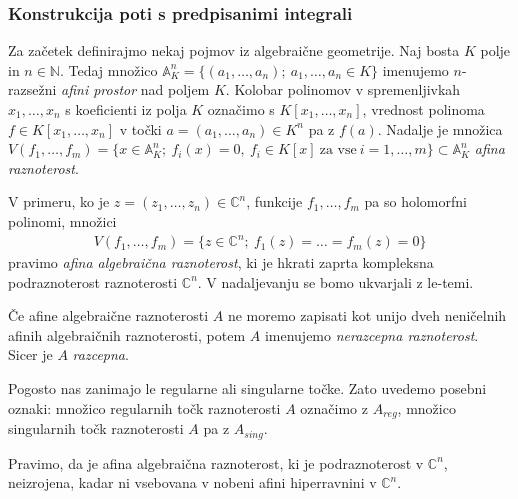 \documentclass[12pt,a4paper,twoside]{article}
\theoremstyle{definition} %
\theoremstyle{plain} %
\numberwithin{equation}{section}  %
\begin{document}
\subsubsection{Konstrukcija poti s predpisanimi integrali}
%
Za začetek definirajmo nekaj pojmov iz algebraične geometrije. \newline
Naj bosta $K$ polje in $n \in \mathbb{N}$. Tedaj množico $\mathbb{A}_{K}^{n} = \{ (a_{1}, \dots , a_{n}); \ a_{1}, \dots , a_{n} \in K \}$ imenujemo $n$-razsežni \emph{afini prostor} nad poljem $K$.
Kolobar polinomov v spremenljivkah $x_{1}, \dots , x_{n}$ s koeficienti iz polja $K$ označimo s $K[x_{1}, \dots , x_{n}]$, vrednost polinoma $f \in K[x_{1}, \dots , x_{n}]$ v točki $a = (a_{1}, \dots , a_{n}) \in K^{n}$ pa z $f(a)$.
Nadalje je množica $V(f_{1}, \dots , f_{m}) = \{ x \in \mathbb{A}_{K}^{n} ; \ f_{i}(x) = 0, \ f_{i} \in K[x] \ \textrm{za vse} \ i = 1, \dots , m \} \subset \mathbb{A}_{K}^{n}$ \emph{afina raznoterost}.

V primeru, ko je $z = (z_{1}, \dots , z_{n}) \in \mathbb{C}^{n}$, funkcije $f_{1}, \dots , f_{m}$ pa so holomorfni polinomi, množici
\begin{gather}
V(f_{1}, \dots , f_{m}) = \{ z \in \mathbb{C}^{n}; \ f_{1}(z) = \dots = f_{m}(z) = 0 \}
\end{gather}
pravimo \emph{afina algebraična raznoterost}, ki je hkrati zaprta kompleksna podraznoterost raznoterosti $\mathbb{C}^{n}$.
V nadaljevanju se bomo ukvarjali z le-temi.

Če afine algebraične raznoterosti $A$ ne moremo zapisati kot unijo dveh neničelnih afinih algebraičnih raznoterosti, potem $A$ imenujemo \emph{nerazcepna raznoterost}.
Sicer je $A$ \emph{razcepna}.

Pogosto nas zanimajo le regularne ali singularne točke. Zato uvedemo posebni oznaki:
množico regularnih točk raznoterosti $A$ označimo z $A_{reg}$, množico singularnih točk raznoterosti $A$ pa z $A_{sing}$.

Pravimo, da je afina algebraična raznoterost, ki je podraznoterost v $\mathbb{C}^{n}$, neizrojena, kadar ni vsebovana v nobeni afini hiperravnini v $\mathbb{C}^{n}$.
\end{document}
